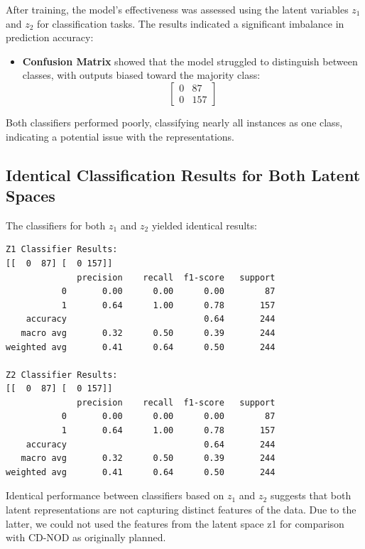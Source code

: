 \documentclass[12pt,letterpaper]{article}
\begin{document}
After training, the model's effectiveness was assessed using the latent variables $z_1$ and $z_2$ for classification tasks. The results indicated a significant imbalance in prediction accuracy:

\begin{itemize}
    \item \textbf{Confusion Matrix} showed that the model struggled to distinguish between classes, with outputs biased toward the majority class:
    \[
    \begin{bmatrix}
        0 & 87 \\
        0 & 157
    \end{bmatrix}
    \]
\end{itemize}

Both classifiers performed poorly, classifying nearly all instances as one class, indicating a potential issue with the representations.

\subsection{Identical Classification Results for Both Latent Spaces}

The classifiers for both \( z_1 \) and \( z_2 \) yielded identical results:

\begin{verbatim}
Z1 Classifier Results:
[[  0  87] [  0 157]]
              precision    recall  f1-score   support
           0       0.00      0.00      0.00        87
           1       0.64      1.00      0.78       157
    accuracy                           0.64       244
   macro avg       0.32      0.50      0.39       244
weighted avg       0.41      0.64      0.50       244

Z2 Classifier Results:
[[  0  87] [  0 157]]
              precision    recall  f1-score   support
           0       0.00      0.00      0.00        87
           1       0.64      1.00      0.78       157
    accuracy                           0.64       244
   macro avg       0.32      0.50      0.39       244
weighted avg       0.41      0.64      0.50       244
\end{verbatim}

Identical performance between classifiers based on \( z_1 \) and \( z_2 \) suggests that both latent representations are not capturing distinct features of the data. Due to the latter, we could not used the features from the latent space z1 for comparison with CD-NOD as originally planned.
\end{document}

